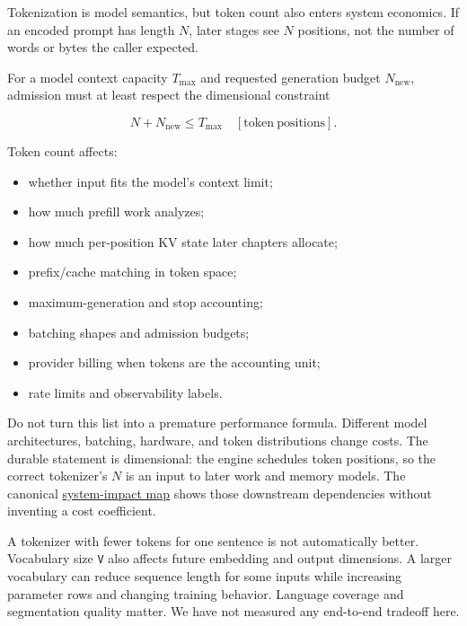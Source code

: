 Tokenization is model semantics, but token count also enters system
economics. If an encoded prompt has length \(N\), later stages see \(N\)
positions, not the number of words or bytes the caller expected.

For a model context capacity \(T_{\max}\) and requested generation
budget \(N_{\mathrm{new}}\), admission must at least respect the
dimensional constraint

\begin{equation}
N+N_{\mathrm{new}}\le T_{\max}\quad[\mathrm{token\ positions}].
\end{equation}

Token count affects:

\begin{itemize}
\tightlist
\item
  whether input fits the model's context limit;
\item
  how much prefill work  analyzes;
\item
  how much per-position KV state later chapters allocate;
\item
  prefix/cache matching in token space;
\item
  maximum-generation and stop accounting;
\item
  batching shapes and admission budgets;
\item
  provider billing when tokens are the accounting unit;
\item
  rate limits and observability labels.
\end{itemize}

Do not turn this list into a premature performance formula. Different
model architectures, batching, hardware, and token distributions change
costs. The durable statement is dimensional: the engine schedules token
positions, so the correct tokenizer's \(N\) is an input to later work
and memory models. The canonical
\href{https://github.com/hermonai/inside-the-llm-engine/blob/astra-visual-rewrite/diagrams/tokenizer/token-count-system-impact.txt}{system-impact
map} shows those downstream dependencies without inventing a cost
coefficient.

A tokenizer with fewer tokens for one sentence is not automatically
better. Vocabulary size \texttt{V} also affects future embedding and
output dimensions. A larger vocabulary can reduce sequence length for
some inputs while increasing parameter rows and changing training
behavior. Language coverage and segmentation quality matter. We have not
measured any end-to-end tradeoff here.

